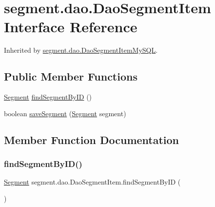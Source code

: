 \hypertarget{interfacesegment_1_1dao_1_1_dao_segment_item}{}\section{segment.\+dao.\+Dao\+Segment\+Item Interface Reference}
\label{interfacesegment_1_1dao_1_1_dao_segment_item}


Inherited by \mbox{\hyperlink{classsegment_1_1dao_1_1_dao_segment_item_my_s_q_l}{segment.\+dao.\+Dao\+Segment\+Item\+My\+S\+QL}}.

\subsection*{Public Member Functions}
\begin{DoxyCompactItemize}
\item 
\mbox{\hyperlink{classclases_1_1_segment}{Segment}} \mbox{\hyperlink{interfacesegment_1_1dao_1_1_dao_segment_item_ab347059b047c0c014ca50b38055673a5}{find\+Segment\+By\+ID}} ()
\item 
boolean \mbox{\hyperlink{interfacesegment_1_1dao_1_1_dao_segment_item_a1535dcb8477f7ab96c81041d8c86ba35}{save\+Segment}} (\mbox{\hyperlink{classclases_1_1_segment}{Segment}} segment)
\end{DoxyCompactItemize}


\subsection{Member Function Documentation}
\mbox{\label{interfacesegment_1_1dao_1_1_dao_segment_item_ab347059b047c0c014ca50b38055673a5}} 
\subsubsection{\texorpdfstring{find\+Segment\+By\+I\+D()}{findSegmentByID()}}
{\footnotesize\ttfamily \mbox{\hyperlink{classclases_1_1_segment}{Segment}} segment.\+dao.\+Dao\+Segment\+Item.\+find\+Segment\+By\+ID (\begin{DoxyParamCaption}{ }\end{DoxyParamCaption})}



